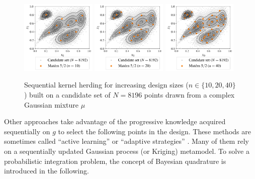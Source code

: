 \begin{figure}[!h]
\begin{center}
    \includegraphics[width=0.32\textwidth]{part2/figures/DCE/numerical_experiments/gaussian_mixture_sampling10.jpg}
    \includegraphics[width=0.32\textwidth]{part2/figures/DCE/numerical_experiments/gaussian_mixture_sampling20.jpg}
    \includegraphics[width=0.32\textwidth]{part2/figures/DCE/numerical_experiments/gaussian_mixture_sampling40.jpg}
\end{center}
\caption{Sequential kernel herding for increasing design sizes ($n\in\{10, 20, 40\}$) built on a candidate set of $N=8196$ points drawn from a complex Gaussian mixture $\mu$} \label{fig:KH_mixture}
\end{figure}

Other approaches take advantage of the progressive knowledge acquired sequentially on $g$ to select the following points in the design. 
These methods are sometimes called ``active learning'' or ``adaptive strategies'' \citep{fau_2021}. 
Many of them rely on a sequentially updated Gaussian process (or Kriging) metamodel. 
To solve a probabilistic integration problem, the concept of Bayesian quadrature is introduced in the following. 

